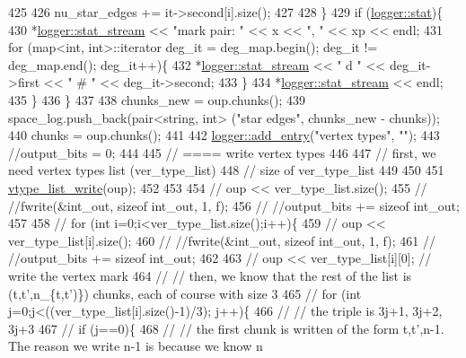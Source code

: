 \begin{DoxyCode}
425 
426       nu\_star\_edges += it->second[i].size();
427       
428     \}
429     \textcolor{keywordflow}{if} (\hyperlink{classlogger_a26812b5ba03f130e8dae3446d5fc032f}{logger::stat})\{
430       *\hyperlink{classlogger_a7db37821f875f2ba3540980b355779f5}{logger::stat\_stream} << \textcolor{stringliteral}{"mark pair: "} <<  x << \textcolor{stringliteral}{", "} << xp << endl;
431       \textcolor{keywordflow}{for} (map<int, int>::iterator deg\_it = deg\_map.begin(); deg\_it != deg\_map.end(); deg\_it++)\{
432         *\hyperlink{classlogger_a7db37821f875f2ba3540980b355779f5}{logger::stat\_stream} << \textcolor{stringliteral}{" d "} << deg\_it->first << \textcolor{stringliteral}{" # "} << deg\_it->second;
433       \}
434       *\hyperlink{classlogger_a7db37821f875f2ba3540980b355779f5}{logger::stat\_stream} << endl;
435     \}
436   \}
437   
438   chunks\_new = oup.chunks();
439   space\_log.push\_back(pair<string, int> (\textcolor{stringliteral}{"star edges"}, chunks\_new - chunks));
440   chunks = oup.chunks();
441 
442   \hyperlink{classlogger_a710163deb17bc81f70d53d285b8ac9ac}{logger::add\_entry}(\textcolor{stringliteral}{"vertex types"}, \textcolor{stringliteral}{""});
443   \textcolor{comment}{//output\_bits = 0;}
444   
445   \textcolor{comment}{// ==== write vertex types}
446 
447   \textcolor{comment}{// first, we need vertex types list (ver\_type\_list)}
448   \textcolor{comment}{// size of ver\_type\_list}
449 
450 
451   \hyperlink{classmarked__graph__compressed_a889749dd51bc37917a156e337eac142a}{vtype\_list\_write}(oup);
452 
453 
454   \textcolor{comment}{// oup <<  ver\_type\_list.size();}
455   \textcolor{comment}{// //fwrite(&int\_out, sizeof int\_out, 1, f);}
456   \textcolor{comment}{// //output\_bits += sizeof int\_out;}
457 
458   \textcolor{comment}{// for (int i=0;i<ver\_type\_list.size();i++)\{}
459   \textcolor{comment}{//   oup << ver\_type\_list[i].size();}
460   \textcolor{comment}{//   //fwrite(&int\_out, sizeof int\_out, 1, f);}
461   \textcolor{comment}{//   //output\_bits += sizeof int\_out;}
462 
463   \textcolor{comment}{//   oup << ver\_type\_list[i][0]; // write the vertex mark}
464   \textcolor{comment}{//   // then, we know that the rest of the list is (t,t',n\_\{t,t')\}) chunks, each of course with size 3}
465   \textcolor{comment}{//   for (int j=0;j<((ver\_type\_list[i].size()-1)/3); j++)\{}
466   \textcolor{comment}{//     // the triple is 3j+1, 3j+2, 3j+3}
467   \textcolor{comment}{//     if (j==0)\{}
468   \textcolor{comment}{//       // the first chunk is written of the form t,t',n-1. The reason we write n-1 is because we know n
}
\end{DoxyCode}
